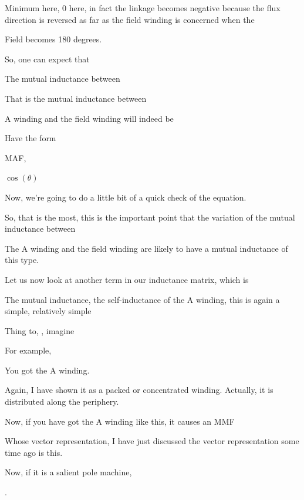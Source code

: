 \documentclass{article}
\begin{document}
Minimum here, $0$ here, in fact the linkage becomes negative because the flux direction is reversed as far as the field winding is concerned when the

Field becomes 180 degrees.

So, one can expect that

The mutual inductance between

That is the mutual inductance between



A winding and the field winding will indeed be

Have the form

MAF,

$\cos(\theta)$

Now, we're going to do a little bit of a quick check of the equation.

So, that is the most, this is the important point that the variation of the mutual inductance between

The A winding and the field winding are likely to have a mutual inductance of this type.

Let us now look at another term in our inductance matrix, which is

The mutual inductance, the self-inductance of the A winding, this is again a simple, relatively simple

Thing to, , imagine

For example,

You got the A winding.



Again, I have shown it as a packed or concentrated winding. Actually, it is distributed along the periphery.

Now, if you have got the A winding like this, it causes an MMF

Whose vector representation, I have just discussed the vector representation some time ago is this.

Now, if it is a salient pole machine,



.
\end{document}
